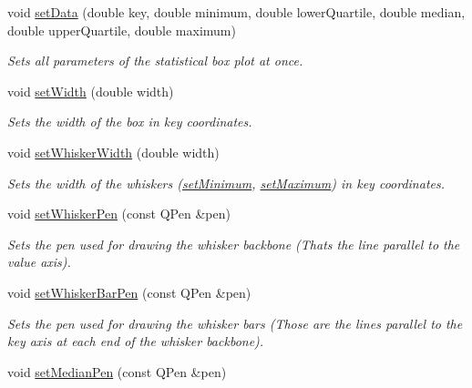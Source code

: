 \begin{DoxyCompactItemize}
void \hyperlink{classQCPStatisticalBox_adf50c57b635edb12470c0e4a986aff37}{set\+Data} (double key, double minimum, double lower\+Quartile, double median, double upper\+Quartile, double maximum)
\begin{DoxyCompactList}\small\item\em Sets all parameters of the statistical box plot at once. \end{DoxyCompactList}\item 
void \hyperlink{classQCPStatisticalBox_a0b62775bd67301b1eba5c785f2b26f14}{set\+Width} (double width)
\begin{DoxyCompactList}\small\item\em Sets the width of the box in key coordinates. \end{DoxyCompactList}\item 
void \hyperlink{classQCPStatisticalBox_adf378812446bd66f34d1f7f293d991cd}{set\+Whisker\+Width} (double width)
\begin{DoxyCompactList}\small\item\em Sets the width of the whiskers (\hyperlink{classQCPStatisticalBox_a84ff7cc61ba44890f0c3e0c99c19941e}{set\+Minimum}, \hyperlink{classQCPStatisticalBox_acec5ad1901f00f2c5387cfb4d9787eb3}{set\+Maximum}) in key coordinates. \end{DoxyCompactList}\item 
void \hyperlink{classQCPStatisticalBox_a4a5034cb3b9b040444df05ab1684620b}{set\+Whisker\+Pen} (const Q\+Pen \&pen)
\begin{DoxyCompactList}\small\item\em Sets the pen used for drawing the whisker backbone (That\textquotesingle{}s the line parallel to the value axis). \end{DoxyCompactList}\item 
void \hyperlink{classQCPStatisticalBox_aa8d3e503897788e1abf68dc74b5f147f}{set\+Whisker\+Bar\+Pen} (const Q\+Pen \&pen)
\begin{DoxyCompactList}\small\item\em Sets the pen used for drawing the whisker bars (Those are the lines parallel to the key axis at each end of the whisker backbone). \end{DoxyCompactList}\item 
\hypertarget{classQCPStatisticalBox_a7260ac55b669f5d0a74f16d5ca84c52c}{}void \hyperlink{classQCPStatisticalBox_a7260ac55b669f5d0a74f16d5ca84c52c}{set\+Median\+Pen} (const Q\+Pen \&pen)\label{classQCPStatisticalBox_a7260ac55b669f5d0a74f16d5ca84c52c}


\end{DoxyCompactItemize}
